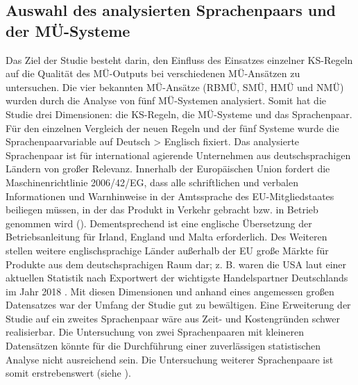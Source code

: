\subsection{Auswahl des analysierten Sprachenpaars und der MÜ-Systeme}
\label{sec:4.4.1}
Das Ziel der Studie besteht darin, den Einfluss des Einsatzes einzelner KS-Regeln auf die Qualität des MÜ-Outputs bei verschiedenen MÜ-Ansätzen zu untersuchen. Die vier bekannten MÜ-Ansätze (RBMÜ, SMÜ, HMÜ und NMÜ) wurden durch die Analyse von fünf MÜ-Systemen analysiert. Somit hat die Studie drei Dimensionen: die KS-Regeln, die MÜ-Systeme und das Sprachenpaar. Für den einzelnen Vergleich der neuen Regeln und der fünf Systeme wurde die Sprachenpaarvariable auf Deutsch > Englisch fixiert. Das analysierte Sprachenpaar ist für international agierende Unternehmen aus deutschsprachigen Ländern von großer Relevanz. Innerhalb der Europäischen Union fordert die Maschinenrichtlinie 2006/42/EG, dass alle schriftlichen und verbalen Informationen und Warnhinweise in der Amtssprache des EU-Mitgliedstaates beiliegen müssen, in der das Produkt in Verkehr gebracht bzw. in Betrieb genommen wird (\citealt{tekomRGAlbDonau2010}). Dementsprechend ist eine englische Übersetzung der Betriebsanleitung für Irland, England und Malta erforderlich. Des Weiteren stellen weitere englischsprachige Länder außerhalb der EU große Märkte für Produkte aus dem deutschsprachigen Raum dar; z. B. waren die USA laut einer aktuellen Statistik nach Exportwert der wichtigste Handelspartner Deutschlands im Jahr 2018 \citep{Statista2019}. Mit diesen Dimensionen und anhand eines angemessen großen Datensatzes war der Umfang der Studie gut zu bewältigen. Eine Erweiterung der Studie auf ein zweites Sprachenpaar wäre aus Zeit- und Kostengründen schwer realisierbar. Die Untersuchung von zwei Sprachenpaaren mit kleineren Datensätzen könnte für die Durchführung einer zuverlässigen statistischen Analyse nicht ausreichend sein. Die Untersuchung weiterer Sprachenpaare ist somit erstrebenswert (siehe ).

